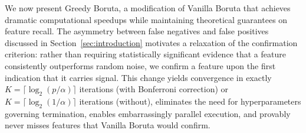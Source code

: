 \documentclass[runningheads]{llncs}
\newcommand{\writeme}[1]{\todo[inline,color=yellow!40]{WRITE: #1}}
\begin{document}

We now present Greedy Boruta, a modification of Vanilla Boruta that achieves dramatic computational speedups while maintaining theoretical guarantees on feature recall. The asymmetry between false negatives and false positives discussed in Section~\ref{sec:introduction} motivates a relaxation of the confirmation criterion: rather than requiring statistically significant evidence that a feature consistently outperforms random noise, we confirm a feature upon the first indication that it carries signal. This change yields convergence in exactly $K = \lceil \log_2(p/\alpha) \rceil$ iterations (with Bonferroni correction) or $K = \lceil \log_2(1/\alpha) \rceil$ iterations (without), eliminates the need for hyperparameters governing termination, enables embarrassingly parallel execution, and provably never misses features that Vanilla Boruta would confirm.

\end{document}
